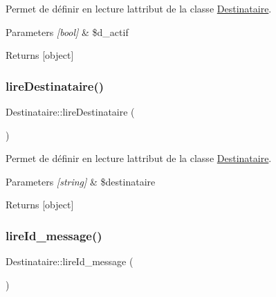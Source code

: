 Permet de définir en lecture l\textquotesingle{}attribut de la classe \hyperlink{class_destinataire}{Destinataire}. 


\begin{DoxyParams}{Parameters}
{\em \mbox{[}bool\mbox{]}} & \$d\+\_\+actif \\
\hline
\end{DoxyParams}
\begin{DoxyReturn}{Returns}
\mbox{[}object\mbox{]} 
\end{DoxyReturn}
\mbox{\label{class_destinataire_a6ea5813438da84b4f2f2789008b251d3}} 
\subsubsection{\texorpdfstring{lire\+Destinataire()}{lireDestinataire()}}
{\footnotesize\ttfamily Destinataire\+::lire\+Destinataire (\begin{DoxyParamCaption}{ }\end{DoxyParamCaption})}



Permet de définir en lecture l\textquotesingle{}attribut de la classe \hyperlink{class_destinataire}{Destinataire}. 


\begin{DoxyParams}{Parameters}
{\em \mbox{[}string\mbox{]}} & \$destinataire \\
\hline
\end{DoxyParams}
\begin{DoxyReturn}{Returns}
\mbox{[}object\mbox{]} 
\end{DoxyReturn}
\mbox{\label{class_destinataire_adfd6ed497eb752f688aa4de52cd06704}} 
\subsubsection{\texorpdfstring{lire\+Id\+\_\+message()}{lireId\_message()}}
{\footnotesize\ttfamily Destinataire\+::lire\+Id\+\_\+message (\begin{DoxyParamCaption}{ }\end{DoxyParamCaption})}



